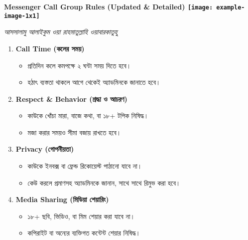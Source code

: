 \documentclass[12pt]{article}
\begin{document}
\begin{center}
    \vspace*{1cm}
    \Huge\bfseries Messenger Call Group Rules (Updated & Detailed)
    \vspace*{0.5cm}
    \texttt{[image: example-image-1x1]} %
\end{center}

\vspace{1cm}
\begin{center}
    \large\itshape আসসালামু আলাইকুম ওয়া রাহমাতুল্লাহি ওয়াবারকাতুহু
\end{center}

\vspace{1cm}
\begin{enumerate}[label=\arabic*., itemsep=10pt, leftmargin=*]
    \item \textbf{Call Time (কলের সময়)}
    \begin{itemize}[label=$\diamond$]
        \item প্রতিদিন কলে কমপক্ষে ২ ঘন্টা সময় দিতে হবে।
        \item হঠাৎ ব্যস্ততা থাকলে আগে থেকেই অ্যাডমিনকে জানাতে হবে।
    \end{itemize}

    \item \textbf{Respect \& Behavior (শ্রদ্ধা ও আচরণ)}
    \begin{itemize}[label=$\diamond$]
        \item কাউকে খোঁচা মারা, বাজে কথা, বা ১৮+ টপিক নিষিদ্ধ।
        \item মজা করার সময়ও সীমা বজায় রাখতে হবে।
    \end{itemize}

    \item \textbf{Privacy (গোপনীয়তা)}
    \begin{itemize}[label=$\diamond$]
        \item কাউকে ইনবক্স বা ফ্রেন্ড রিকোয়েস্ট পাঠানো যাবে না।
        \item কেউ করলে প্রমাণসহ অ্যাডমিনকে জানান, সাথে সাথে রিমুভ করা হবে।
    \end{itemize}

    \item \textbf{Media Sharing (মিডিয়া শেয়ারিং)}
    \begin{itemize}[label=$\diamond$]
        \item ১৮+ ছবি, ভিডিও, বা মিম শেয়ার করা যাবে না।
        \item কপিরাইট বা অন্যের ব্যক্তিগত কন্টেন্ট শেয়ার নিষিদ্ধ।
    \end{itemize}


\end{enumerate}
\end{document}
